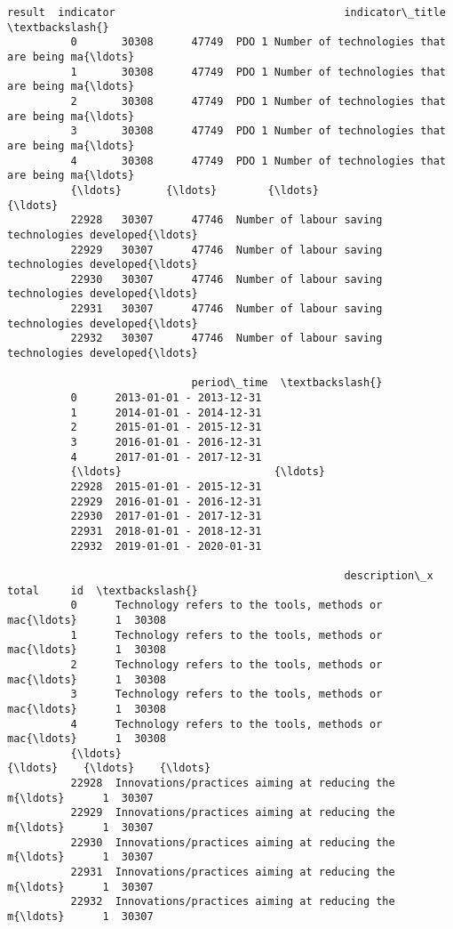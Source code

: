 \documentclass[11pt]{article}
\begin{document}
\begin{Verbatim}[commandchars=\\\{\}]
                 result  indicator                                    indicator\_title  \textbackslash{}
          0       30308      47749  PDO 1 Number of technologies that are being ma{\ldots}   
          1       30308      47749  PDO 1 Number of technologies that are being ma{\ldots}   
          2       30308      47749  PDO 1 Number of technologies that are being ma{\ldots}   
          3       30308      47749  PDO 1 Number of technologies that are being ma{\ldots}   
          4       30308      47749  PDO 1 Number of technologies that are being ma{\ldots}   
          {\ldots}       {\ldots}        {\ldots}                                                {\ldots}   
          22928   30307      47746  Number of labour saving technologies developed{\ldots}   
          22929   30307      47746  Number of labour saving technologies developed{\ldots}   
          22930   30307      47746  Number of labour saving technologies developed{\ldots}   
          22931   30307      47746  Number of labour saving technologies developed{\ldots}   
          22932   30307      47746  Number of labour saving technologies developed{\ldots}   
          
                             period\_time  \textbackslash{}
          0      2013-01-01 - 2013-12-31   
          1      2014-01-01 - 2014-12-31   
          2      2015-01-01 - 2015-12-31   
          3      2016-01-01 - 2016-12-31   
          4      2017-01-01 - 2017-12-31   
          {\ldots}                        {\ldots}   
          22928  2015-01-01 - 2015-12-31   
          22929  2016-01-01 - 2016-12-31   
          22930  2017-01-01 - 2017-12-31   
          22931  2018-01-01 - 2018-12-31   
          22932  2019-01-01 - 2020-01-31   
          
                                                     description\_x  total     id  \textbackslash{}
          0      Technology refers to the tools, methods or mac{\ldots}      1  30308   
          1      Technology refers to the tools, methods or mac{\ldots}      1  30308   
          2      Technology refers to the tools, methods or mac{\ldots}      1  30308   
          3      Technology refers to the tools, methods or mac{\ldots}      1  30308   
          4      Technology refers to the tools, methods or mac{\ldots}      1  30308   
          {\ldots}                                                  {\ldots}    {\ldots}    {\ldots}   
          22928  Innovations/practices aiming at reducing the m{\ldots}      1  30307   
          22929  Innovations/practices aiming at reducing the m{\ldots}      1  30307   
          22930  Innovations/practices aiming at reducing the m{\ldots}      1  30307   
          22931  Innovations/practices aiming at reducing the m{\ldots}      1  30307   
          22932  Innovations/practices aiming at reducing the m{\ldots}      1  30307   
          

\end{Verbatim}
\end{document}
